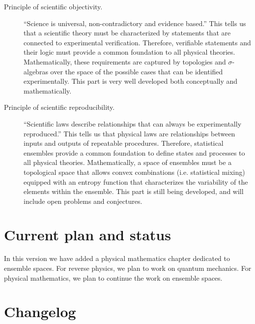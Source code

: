 \documentclass[11pt,letterpaper,fleqn]{memoir} %
\begin{document}
\begin{description}
	\item[Principle of scientific objectivity.] ``Science is universal, non-contradictory and evidence based.'' This tells us that a scientific theory must be characterized by statements that are connected to experimental verification. Therefore, verifiable statements and their logic must provide a common foundation to all physical theories. Mathematically, these requirements are captured by topologies and $\sigma$-algebras over the space of the possible cases that can be identified experimentally. This part is very well developed both conceptually and mathematically. 
	
	\item[Principle of scientific reproducibility.] ``Scientific laws describe relationships that can always be experimentally reproduced.'' This tells us that physical laws are relationships between inputs and outputs of repeatable procedures. Therefore, statistical ensembles provide a common foundation to define states and processes to all physical theories. Mathematically, a space of ensembles must be a topological space that allows convex combinations (i.e. statistical mixing) equipped with an entropy function that characterizes the variability of the elements within the ensemble. This part is still being developed, and will include open problems and conjectures.
\end{description}


\section*{Current plan and status}

In this version we have added a physical mathematics chapter dedicated to ensemble spaces. For reverse physics, we plan to work on quantum mechanics. For physical mathematics, we plan to continue the work on ensemble spaces.

\section*{Changelog}
\end{document}
